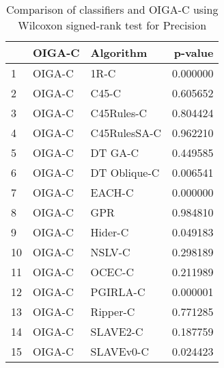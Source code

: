 \begin{table}
\footnotesize
\caption{Comparison of classifiers and OIGA-C using Wilcoxon signed-rank test for Precision}
\label{tab:OIGA-C wilcoxon Precision comparison}
\begin{tabular}{lllr}
\hline
 & OIGA-C & Algorithm & p-value \\
\hline
1 & OIGA-C & 1R-C & 0.000000 \\
2 & OIGA-C & C45-C & 0.605652 \\
3 & OIGA-C & C45Rules-C & 0.804424 \\
4 & OIGA-C & C45RulesSA-C & 0.962210 \\
5 & OIGA-C & DT GA-C & 0.449585 \\
6 & OIGA-C & DT Oblique-C & 0.006541 \\
7 & OIGA-C & EACH-C & 0.000000 \\
8 & OIGA-C & GPR & 0.984810 \\
9 & OIGA-C & Hider-C & 0.049183 \\
10 & OIGA-C & NSLV-C & 0.298189 \\
11 & OIGA-C & OCEC-C & 0.211989 \\
12 & OIGA-C & PGIRLA-C & 0.000001 \\
13 & OIGA-C & Ripper-C & 0.771285 \\
14 & OIGA-C & SLAVE2-C & 0.187759 \\
15 & OIGA-C & SLAVEv0-C & 0.024423 \\
\hline
\end{tabular}
\end{table}
